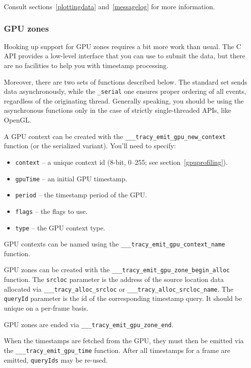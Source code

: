 \documentclass[hidelinks,titlepage,a4paper,twoside]{article}
\begin{document}
Consult sections~\ref{plottingdata} and~\ref{messagelog} for more information.

\subsubsection{GPU zones}

Hooking up support for GPU zones requires a bit more work than usual. The C API provides a low-level interface that you can use to submit the data, but there are no facilities to help you with timestamp processing.

Moreover, there are two sets of functions described below. The standard set sends data asynchronously, while the \texttt{\_serial} one ensures proper ordering of all events, regardless of the originating thread. Generally speaking, you should be using the asynchronous functions only in the case of strictly single-threaded APIs, like OpenGL.

A GPU context can be created with the \texttt{\_\_\_tracy\_emit\_gpu\_new\_context} function (or the serialized variant). You'll need to specify:

\begin{itemize}
\item \texttt{context} -- a unique context id (8-bit, 0--255; see section~\ref{gpuprofiling}).
\item \texttt{gpuTime} -- an initial GPU timestamp.
\item \texttt{period} -- the timestamp period of the GPU.
\item \texttt{flags} -- the flags to use.
\item \texttt{type} -- the GPU context type.
\end{itemize}

GPU contexts can be named using the \texttt{\_\_\_tracy\_emit\_gpu\_context\_name} function.

GPU zones can be created with the \texttt{\_\_\_tracy\_emit\_gpu\_zone\_begin\_alloc} function. The \texttt{srcloc} parameter is the address of the source location data allocated via \texttt{\_\_\_tracy\_alloc\_srcloc} or \texttt{\_\_\_tracy\_alloc\_srcloc\_name}. The \texttt{queryId} parameter is the id of the corresponding timestamp query. It should be unique on a per-frame basis.

GPU zones are ended via \texttt{\_\_\_tracy\_emit\_gpu\_zone\_end}.

When the timestamps are fetched from the GPU, they must then be emitted via the \texttt{\_\_\_tracy\_emit\_gpu\_time} function. After all timestamps for a frame are emitted, \texttt{queryIds} may be re-used.
\end{document}
